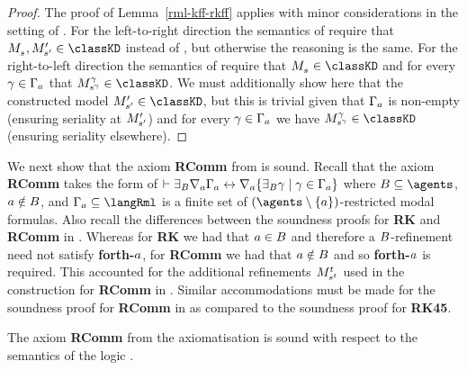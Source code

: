 \begin{proof}
The proof of Lemma~\ref{rml-kff-rkff} applies with minor considerations in the setting of \logicRmlKD{}.
For the left-to-right direction the semantics of \logicRmlKD{} require that $\kPModel{\kStateS}, \kPModelP{\kStateSP} \in \classKD$ instead of \classKFF{}, but otherwise the reasoning is the same.
For the right-to-left direction the semantics of \logicRmlKD{} require that $\kPModel{\kStateS} \in \classKD$ and for every $\gamma \in \Gamma_a$ that $\kPModel[\gamma]{\kStateS[\gamma]} \in \classKD$.
We must additionally show here that the constructed model $\kPModelP{\kStateSP} \in \classKD$, but this is trivial given that $\Gamma_a$ is non-empty (ensuring seriality at ${M^{\prime}_{{s}^{\prime}}}$) and for every $\gamma \in \Gamma_a$ we have $\kPModel[\gamma]{\kStateS[\gamma]} \in \classKD$ (ensuring seriality elsewhere).
\end{proof}

We next show that the axiom {\bf RComm} from \axiomRmlKFF{} is sound.
Recall that the axiom {\bf RComm} takes the form of $\vdash {\exists_{B}} \nabla_{a} \Gamma_a \leftrightarrow \nabla_{a} \{{\exists_{B}} \gamma \mid \gamma \in \Gamma_a\}$ where $\agentsB \subseteq \agents$, $a \notin B$, and $\Gamma_\agentA \subseteq \langRml$ is a finite set of $(\agents \setminus \{\agentA\})$-restricted modal formulas.
Also recall the differences between the soundness proofs for {\bf RK} and {\bf RComm} in \axiomRmlK{}.
Whereas for {\bf RK} we had that $a \in B$ and therefore a $B$-refinement need not satisfy {\bf forth-$a$}, for {\bf RComm} we had that $a \notin B$ and so {\bf forth-$a$} is required.
This accounted for the additional refinements $\kPModel[\kStateT]{\kStateS[\kStateT]}$ used in the construction for {\bf RComm} in \axiomRmlK{}.
Similar accommodations must be made for the soundness proof for {\bf RComm} in \axiomRmlKFF{} as compared to the soundness proof for {\bf RK45}.

\begin{lemma}\label{rml-kff-rcomm}
The axiom {\bf RComm} from the axiomatisation \axiomRmlKFF{} is sound with respect to the semantics of the logic \logicRmlKFF{}.
\end{lemma}

